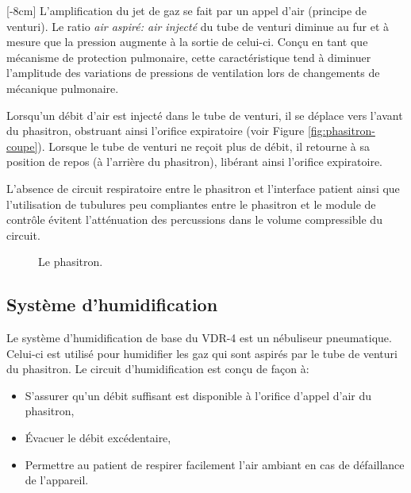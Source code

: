 [-8cm]
L'amplification du jet de gaz se fait par un appel d'air (principe de
venturi).  Le ratio \emph{air aspiré: air injecté} du tube de venturi
diminue au fur et à mesure que la pression augmente à la sortie de
celui-ci. Conçu en tant que mécanisme de protection pulmonaire, cette
caractéristique tend à diminuer l'amplitude des variations de
pressions de ventilation lors de changements de mécanique pulmonaire.

Lorsqu'un débit d'air est injecté dans le tube de venturi, il se
déplace vers l'avant du phasitron, obstruant ainsi l'orifice
expiratoire (voir Figure \ref{fig:phasitron-coupe}). Lorsque le tube
de venturi ne reçoit plus de débit, il retourne à sa position de repos
(à l'arrière du phasitron), libérant ainsi l'orifice expiratoire.

L'absence de circuit respiratoire entre le phasitron et l'interface
patient ainsi que l'utilisation de tubulures peu compliantes entre le
phasitron et le module de contrôle évitent l'atténuation des
percussions dans le volume compressible du circuit.

\begin{figure}
	
	\caption{Le phasitron.}
\end{figure}

\subsection{Système d’humidification}

Le système d'humidification de base du VDR-4 est un nébuliseur pneumatique.
Celui-ci est utilisé pour humidifier les gaz qui sont aspirés par le tube de
venturi du phasitron. Le circuit d'humidification est conçu de façon à:

\begin{itemize}
	\item S'assurer qu'un débit suffisant est disponible à l'orifice d'appel d'air du phasitron,
	\item Évacuer le débit excédentaire,
	\item Permettre au patient de respirer facilement l'air ambiant en cas de défaillance de l'appareil.
\end{itemize}

